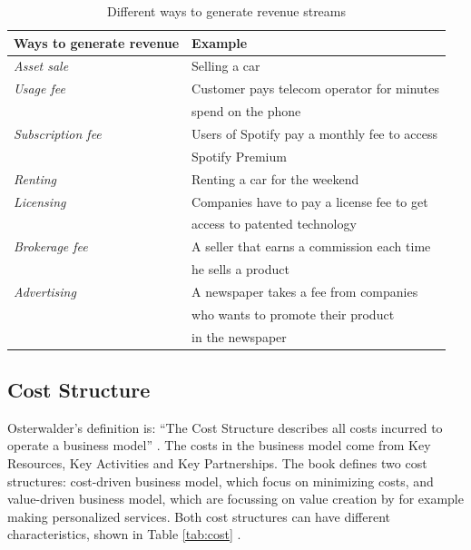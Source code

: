 \begin{table}
\centering
     \caption[Different ways to generate revenue streams]{Different ways to generate revenue streams}
    \begin{tabular}{|l|l|}
  
        \hline
       \textbf{Ways to generate revenue} & \textbf{Example}  \\ \hline
       \emph{Asset sale} & Selling a car \\ \hline
       \emph{Usage fee} & Customer pays telecom operator for minutes \\ & spend on the phone \\ \hline
	 	\emph{Subscription fee} & Users of Spotify pay a monthly fee to access \\ & Spotify Premium \\ \hline
	   \emph{Renting} & Renting a car for the weekend \\ \hline
	   \emph{Licensing}	& Companies have to pay a license fee to get \\ & access to patented technology  \\ \hline
	   \emph{Brokerage fee}	& A seller that earns a commission each time \\ & he sells a product  \\ \hline
	   \emph{Advertising} & A newspaper takes a fee from companies \\ & who wants to promote their product \\ &in the newspaper \\ \hline
    \end{tabular}
    \label{tab:revenue}
\end{table}

\subsection{Cost Structure}
Osterwalder’s definition is: “The Cost Structure describes all costs incurred to operate a business model” \cite{osterwalder}. The costs in the business model come from Key Resources, Key Activities and Key Partnerships. The book \cite{osterwalder} defines two cost structures: cost-driven business model, which focus on minimizing costs, and value-driven business model, which are focussing on value creation by for example making personalized services. Both cost structures can have different characteristics, shown in Table \ref{tab:cost} \cite{osterwalder}. \\ \\

